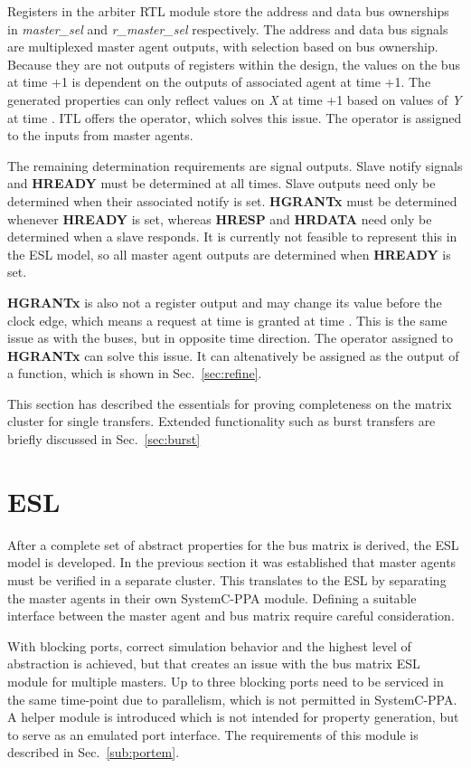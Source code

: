 Registers in the arbiter RTL module store the address and data bus ownerships in \textit{master\_sel} and \textit{r\_master\_sel} respectively. The address and data bus signals are multiplexed master agent outputs, with selection based on bus ownership. Because they are not outputs of registers within the design, the values on the bus at time +1 is dependent on the outputs of associated agent at time +1. The generated properties can only reflect values on \textit{X} at time +1 based on values of \textit{Y} at time . ITL offers the  operator, which solves this issue. The  operator is assigned to the inputs from master agents. \par
The remaining determination requirements are signal outputs. Slave notify signals and \textbf{HREADY} must be determined at all times. Slave outputs need only be determined when their associated notify is set. \textbf{HGRANTx} must be determined whenever \textbf{HREADY} is set, whereas \textbf{HRESP} and \textbf{HRDATA} need only be determined when a slave responds. It is currently not feasible to represent this in the ESL model, so all master agent outputs are determined when \textbf{HREADY} is set. \par
\textbf{HGRANTx} is also not a register output and may change its value before the clock edge, which means a request at time  is granted at time . This is the same issue as with the buses, but in opposite time direction. The  operator assigned to \textbf{HGRANTx} can solve this issue. It can altenatively be assigned as the output of a function, which is shown in Sec.~\ref{sec:refine}. \par 
This section has described the essentials for proving completeness on the matrix cluster for single transfers. Extended functionality such as burst transfers are briefly discussed in Sec.~\ref{sec:burst}
 

\section{ESL}
After a complete set of abstract properties for the bus matrix is derived, the ESL model is developed. In the previous section it was established that master agents must be verified in a separate cluster. This translates to the ESL by separating the master agents in their own SystemC-PPA module. Defining a suitable interface between the master agent and bus matrix require careful consideration. \par
With blocking ports, correct simulation behavior and the highest level of abstraction is achieved, but that creates an issue with the bus matrix ESL module for multiple masters. Up to three blocking ports need to be serviced in the same time-point due to parallelism, which is not permitted in SystemC-PPA. A helper module is introduced which is not intended for property generation, but to serve as an emulated port interface. The requirements of this module is described in Sec.~\ref{sub:portem}.

